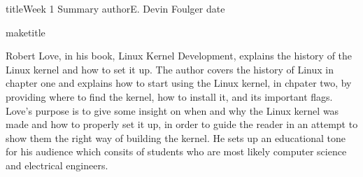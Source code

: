 \documentclass[journal, 10pt]{article}
\def\name{E. Devin Foulger}
\begin{document}
title{Week 1 Summary}
author{\name}
date{} %

maketitle

Robert Love, in his book, Linux Kernel Development, explains the history of the Linux kernel and how to set it up. 
The author covers the history of Linux in chapter one and explains how to start using the Linux kernel, in chpater two,
by providing where to find the kernel, how to install it, and its important flags. Love's purpose is to give some
insight on when and why the Linux kernel was made and how to properly set it up, in order to guide the reader in an
attempt to show them the right way of building the kernel. He sets up an educational tone for his audience which 
consits of students who are most likely computer science and electrical engineers.
\end{document}
